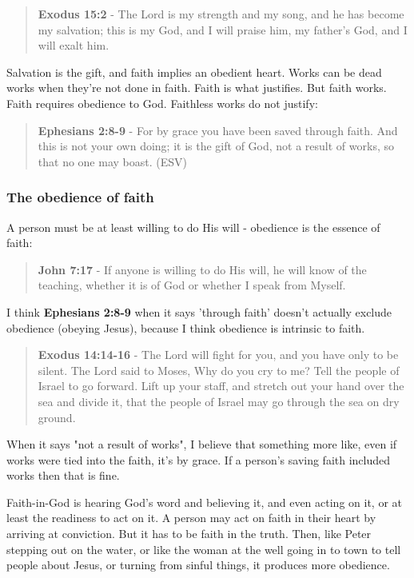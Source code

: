 \documentclass[11pt]{article}
\begin{document}
\begin{quote}
\textbf{Exodus 15:2} - The Lord is my strength and my song, and he has become my salvation; this is my God, and I will praise him, my father's God, and I will exalt him.
\end{quote}

Salvation is the gift, and faith implies an obedient heart. Works can be dead works when they're not done in faith. Faith is what justifies. But faith works. Faith requires obedience to God. Faithless works do not justify:

\begin{quote}
\textbf{Ephesians 2:8-9} - For by grace you have been saved through faith. And this is not your own doing; it is the gift of God, not a result of works, so that no one may boast. (ESV)
\end{quote}

\subsubsection{The obedience of faith}
\label{sec:orgb330e8e}

A person must be at least willing to do His will - obedience is the essence of faith:

\begin{quote}
\textbf{John 7:17} - If anyone is willing to do His will, he will know of the teaching, whether it is of God or whether I speak from Myself.
\end{quote}

I think \textbf{Ephesians 2:8-9} when it says 'through faith' doesn't actually exclude obedience (obeying Jesus), because I think obedience is intrinsic to faith.

\begin{quote}
\textbf{Exodus 14:14-16} - The Lord will fight for you, and you have only to be silent.  The Lord said to Moses, Why do you cry to me? Tell the people of Israel to go forward.  Lift up your staff, and stretch out your hand over the sea and divide it, that the people of Israel may go through the sea on dry ground.
\end{quote}

When it says "not a result of works", I believe that something more like, even if works were tied into the faith, it's by grace. If a person's saving faith included works then that is fine.

Faith-in-God is hearing God's word and believing it, and even acting on it, or at least the readiness to act on it.
A person may act on faith in their heart by arriving at conviction. But it has to be faith in the truth.
Then, like Peter stepping out on the water, or like the woman at the well going in to town to tell people about Jesus, or turning from sinful things, it produces more obedience.
\end{document}
